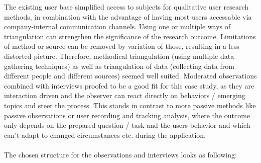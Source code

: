 The existing user base simplified access to subjects for qualitative user research methods, in combination with the advantage of having most users accessable via company-internal communication channels.
Using one or multiple ways of triangulation \cite[p. 264]{Interactiondesign:2019ys} can strengthen the significance of the research outcome. Limitations of method or source can be removed by variation of those, resulting in a less distorted picture.
Therefore, methodical triangulation (using multiple data gathering techniques) as well as triangulation of data (collecting data from different people and different sources) seemed well suited.
Moderated observations combined with interviews proofed to be a good fit for this case study, as they are interaction driven and the observer can react directly on behaviors / emerging topics and steer the process.
This stands in contrast to more passive methods like passive observations or user recording and tracking analysis, where the outcome only depends on the
prepared question / task and the users behavior and which can't adapt to changed circumstances etc. during the application.
\\\\
The chosen structure for the observations and interviews looks as following:

